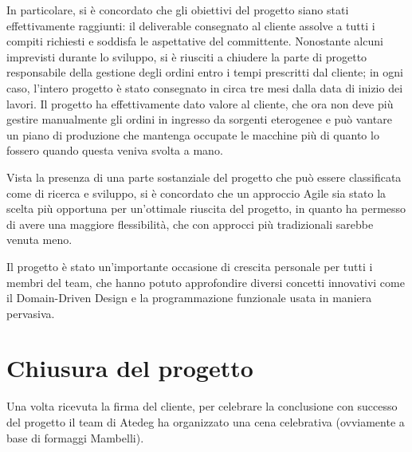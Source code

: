 In particolare, si è concordato che gli obiettivi del progetto siano stati effettivamente raggiunti: il deliverable consegnato al cliente assolve a tutti i compiti richiesti e soddisfa le aspettative del committente.
Nonostante alcuni imprevisti durante lo sviluppo, si è riusciti a chiudere la parte di progetto responsabile della gestione degli ordini entro i tempi prescritti dal cliente; in ogni caso, l'intero progetto è stato consegnato in circa tre mesi dalla data di inizio dei lavori.
Il progetto ha effettivamente dato valore al cliente, che ora non deve più gestire manualmente gli ordini in ingresso da sorgenti eterogenee e può vantare un piano di produzione che mantenga occupate le macchine più di quanto lo fossero quando questa veniva svolta a mano.

Vista la presenza di una parte sostanziale del progetto che può essere classificata come di ricerca e sviluppo, si è concordato che un approccio Agile sia stato la scelta più opportuna per un'ottimale riuscita del progetto, in quanto ha permesso di avere una maggiore flessibilità, che con approcci più tradizionali sarebbe venuta meno.

Il progetto è stato un'importante occasione di crescita personale per tutti i membri del team, che hanno potuto approfondire diversi concetti innovativi come il Domain-Driven Design e la programmazione funzionale usata in maniera pervasiva.

\section{Chiusura del progetto}
Una volta ricevuta la firma del cliente, per celebrare la conclusione con successo del progetto il team di Atedeg ha organizzato una cena celebrativa (ovviamente a base di formaggi Mambelli).
